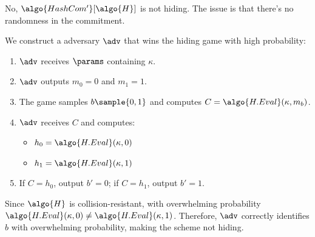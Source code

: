\ifsolutions
\begin{mysolution}
  No, $\algo{HashCom'}[\algo{H}]$ is not hiding.
  The issue is that there's no randomness in the commitment.
  
  We construct a \ppt adversary $\adv$ that wins the hiding game with high probability:
  
  \begin{enumerate}
    \item $\adv$ receives $\params$ containing $\kappa$.
    \item $\adv$ outputs $m_0 = 0$ and $m_1 = 1$.
    \item The game samples $b \sample \{0, 1\}$ and computes $C = \algo{H.Eval}(\kappa, m_b)$.
    \item $\adv$ receives $C$ and computes:
      \begin{itemize}
        \item $h_0 = \algo{H.Eval}(\kappa, 0)$
        \item $h_1 = \algo{H.Eval}(\kappa, 1)$
      \end{itemize}
    \item If $C = h_0$, output $b' = 0$; if $C = h_1$, output $b' = 1$.
  \end{enumerate}
  
  Since $\algo{H}$ is collision-resistant, with overwhelming probability $\algo{H.Eval}(\kappa, 0) \neq \algo{H.Eval}(\kappa, 1)$.
  Therefore, $\adv$ correctly identifies $b$ with overwhelming probability, making the scheme not hiding.
\end{mysolution}
\fi

